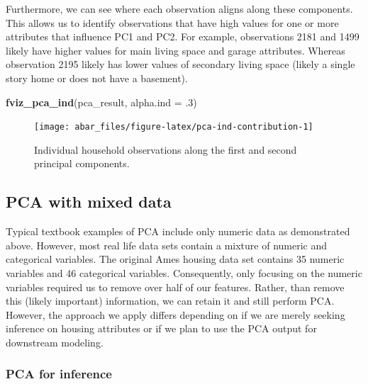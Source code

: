 \documentclass[]{book}
\newenvironment{Shaded}{\begin{snugshade}}{\end{snugshade}}
\newcommand{\DataTypeTok}[1]{\textcolor[rgb]{0.13,0.29,0.53}{#1}}
\newcommand{\FloatTok}[1]{\textcolor[rgb]{0.00,0.00,0.81}{#1}}
\newcommand{\KeywordTok}[1]{\textcolor[rgb]{0.13,0.29,0.53}{\textbf{#1}}}
\newcommand{\NormalTok}[1]{#1}
\theoremstyle{definition}
\theoremstyle{definition}
\theoremstyle{definition}
\theoremstyle{remark}
\begin{document}
Furthermore, we can see where each observation aligns along these
components. This allows us to identify observations that have high
values for one or more attributes that influence PC1 and PC2. For
example, observations 2181 and 1499 likely have higher values for main
living space and garage attributes. Whereas observation 2195 likely has
lower values of secondary living space (likely a single story home or
does not have a basement).

\begin{Shaded}
\begin{Highlighting}[]
\KeywordTok{fviz_pca_ind}\NormalTok{(pca_result, }\DataTypeTok{alpha.ind =} \FloatTok{.3}\NormalTok{)}
\end{Highlighting}
\end{Shaded}

\begin{figure}

{\centering \texttt{[image: abar\_files/figure-latex/pca-ind-contribution-1]} 

}

\caption{Individual household observations along the first and second principal components.}\label{fig:pca-ind-contribution}
\end{figure}

\hypertarget{pca-with-mixed-data}{%
\subsection{PCA with mixed data}\label{pca-with-mixed-data}}

Typical textbook examples of PCA include only numeric data as
demonstrated above. However, most real life data sets contain a mixture
of numeric and categorical variables. The original Ames housing data set
contains 35 numeric variables and 46 categorical variables.
Consequently, only focusing on the numeric variables required us to
remove over half of our features. Rather, than remove this (likely
important) information, we can retain it and still perform PCA. However,
the approach we apply differs depending on if we are merely seeking
inference on housing attributes or if we plan to use the PCA output for
downstream modeling.

\hypertarget{pca-for-inference}{%
\subsubsection{PCA for inference}\label{pca-for-inference}}
\end{document}
